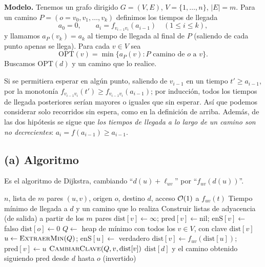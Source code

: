 
\textbf{Modelo.} Tenemos un grafo dirigido $G=(V,E)$, $V=\{1,\dots,n\}$, $|E|=m$. Para un camino $P=(o=v_0,v_1,\dots,v_k)$ definimos los tiempos de llegada
\[ a_0=0,\qquad a_i=f_{v_{i-1}v_i}(a_{i-1})\quad (1\le i\le k), \]
y llamamos $a_P(v_k)=a_k$ al tiempo de llegada al final de $P$ (saliendo de cada punto apenas se llega). Para cada $v\in V$ sea
\[ \mathrm{OPT}(v)=\min\{a_P(v) : P \text{ camino de } o \text{ a } v\}. \]
Buscamos $\mathrm{OPT}(d)$ y un camino que lo realice.

\begin{observacion}
Si se permitiera esperar en algún punto, saliendo de $v_{i-1}$ en un tiempo $t'\ge a_{i-1}$, por la monotonía $f_{v_{i-1}v_i}(t')\ge f_{v_{i-1}v_i}(a_{i-1})$; por inducción, todos los tiempos de llegada posteriores serían mayores o iguales que sin esperar. Así que podemos considerar solo recorridos sin espera, como en la definición de arriba. Además, de las dos hipótesis se sigue que \emph{los tiempos de llegada a lo largo de un camino son no decrecientes}: $a_i=f(a_{i-1})\ge a_{i-1}$.
\end{observacion}

\subsection*{(a) Algoritmo}

Es el algoritmo de Dijkstra, cambiando ``$d(u)+\ell_{uv}$'' por ``$f_{uv}(d(u))$''.

\begin{algorithm}[H]
\caption{Dijkstra dependiente del tiempo}
\begin{algorithmic}[1]
\Require $n$, lista de $m$ pares $(u,v)$, origen $o$, destino $d$, acceso $\mathcal{O}(1)$ a $f_{uv}(t)$
\Ensure Tiempo mínimo de llegada a $d$ y un camino que lo realiza
\State Construir listas de adyacencia (de salida) a partir de los $m$ pares
  \State $\mathrm{dist}[v]\gets\infty$; $\mathrm{pred}[v]\gets \mathrm{nil}$; $\mathrm{enS}[v]\gets$ falso
\EndFor
\State $\mathrm{dist}[o]\gets 0$
\State $Q\gets$ heap de mínimo con todos los $v\in V$, con clave $\mathrm{dist}[v]$
  \State $u\gets \textsc{ExtraerMin}(Q)$; $\mathrm{enS}[u]\gets$ verdadero
      \State $\mathrm{dist}[v]\gets f_{uv}(\mathrm{dist}[u])$; $\mathrm{pred}[v]\gets u$
      \State $\textsc{CambiarClave}(Q,v,\mathrm{dist}[v])$
    \EndIf
  \EndFor
\EndWhile
\State \Return $\mathrm{dist}[d]$ y el camino obtenido siguiendo $\mathrm{pred}$ desde $d$ hasta $o$ (invertido)
\end{algorithmic}
\end{algorithm}


